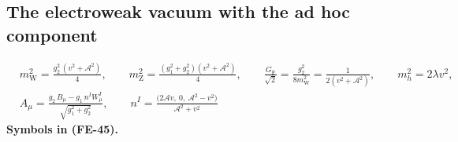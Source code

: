 \documentclass[
  10pt,
]{article}
\begin{document}
\hypertarget{the-electroweak-vacuum-with-the-ad-hoc-component}{%
\subsection{The electroweak vacuum with the ad hoc
component}\label{the-electroweak-vacuum-with-the-ad-hoc-component}}

\[
\begin{aligned}
&m_{\mathrm{W}}^2 = \frac{g_2^2\,(v^2 + \mathcal{A}^2)}{4},\qquad m_{\mathrm{Z}}^2 = \frac{(g_1^2 + g_2^2)(v^2 + \mathcal{A}^2)}{4},\qquad
 \frac{G_{\mathrm{F}}}{\sqrt2} = \frac{g_2^2}{8m_{\mathrm{W}}^2} = \frac{1}{2(v^2 + \mathcal{A}^2)},\qquad m_{h}^2 = 2\lambda v^2,\\
&A_\mu = \frac{g_2\,B_\mu - g_1\,n^I W^I_\mu}{\sqrt{g_1^2 + g_2^2}},\qquad
 n^I = \frac{\big(2\mathcal{A}v,\ 0,\ \mathcal{A}^2 - v^2\big)}{\mathcal{A}^2 + v^2}
\end{aligned} \tag{FE-45}
\] \textbf{Symbols in (FE-45).}
\end{document}
